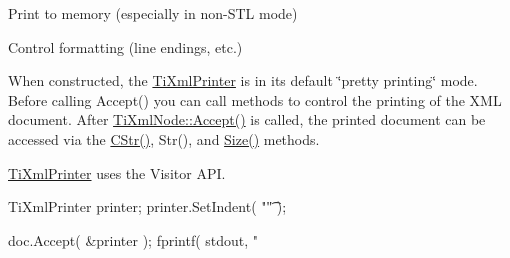 \begin{DoxyEnumerate}
\item Print to memory (especially in non-\/STL mode)
\item Control formatting (line endings, etc.)
\end{DoxyEnumerate}

When constructed, the \hyperlink{class_ti_xml_printer}{TiXmlPrinter} is in its default \char`\"{}pretty printing\char`\"{} mode. Before calling Accept() you can call methods to control the printing of the XML document. After \hyperlink{class_ti_xml_node_acc0f88b7462c6cb73809d410a4f5bb86}{TiXmlNode::Accept()} is called, the printed document can be accessed via the \hyperlink{class_ti_xml_printer_a859eede9597d3e0355b77757be48735e}{CStr()}, Str(), and \hyperlink{class_ti_xml_printer_ad01375ae9199bd2f48252eaddce3039d}{Size()} methods.

\hyperlink{class_ti_xml_printer}{TiXmlPrinter} uses the Visitor API. \begin{DoxyVerb}
	TiXmlPrinter printer;
	printer.SetIndent( "\t" );

	doc.Accept( &printer );
	fprintf( stdout, "%
	\end{DoxyVerb}
 

